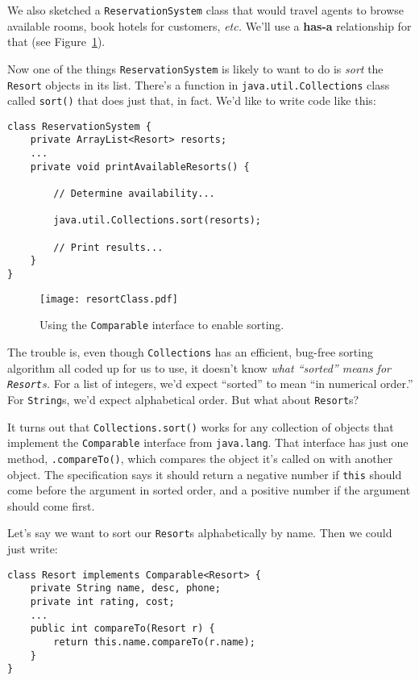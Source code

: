 We also sketched a \texttt{ReservationSystem} class that would travel agents
to browse available rooms, book hotels for customers, \textit{etc.} We'll use
a \textbf{has-a} relationship for that (see Figure~\ref{fig:resortClass}).

Now one of the things \texttt{ReservationSystem} is likely to want to do is
\textit{sort} the \texttt{Resort} objects in its list. There's a function in
\texttt{java.util.Collections} class called \texttt{sort()} that does just
that, in fact. We'd like to write code like this:

\begin{Verbatim}[fontsize=\small,samepage=true,frame=single]
class ReservationSystem {
    private ArrayList<Resort> resorts;
    ...
    private void printAvailableResorts() {

        // Determine availability...

        java.util.Collections.sort(resorts);

        // Print results...
    }
}
\end{Verbatim}

\begin{figure}[hb]
\centering
\texttt{[image: resortClass.pdf]}
\caption{Using the \texttt{Comparable} interface to enable sorting.}
\label{fig:resortClass}
\end{figure}

The trouble is, even though \texttt{Collections} has an efficient, bug-free
sorting algorithm all coded up for us to use, it doesn't know \textit{what
``sorted'' means for \texttt{Resort}s.} For a list of integers, we'd expect
``sorted'' to mean ``in numerical order.'' For \texttt{String}s, we'd expect
alphabetical order. But what about \texttt{Resort}s?

It turns out that \texttt{Collections.sort()} works for any collection of
objects that implement the \texttt{Comparable} interface from
\texttt{java.lang}. That interface has just one method, \texttt{.compareTo()},
which compares the object it's called on with another object. The
specification says it should return a negative number if \texttt{this} should
come before the argument in sorted order, and a positive number if the
argument should come first.

Let's say we want to sort our \texttt{Resort}s alphabetically by name. Then we
could just write:

\begin{Verbatim}[fontsize=\small,samepage=true,frame=single]
class Resort implements Comparable<Resort> {
    private String name, desc, phone;
    private int rating, cost;
    ...
    public int compareTo(Resort r) {
        return this.name.compareTo(r.name);
    }
}
\end{Verbatim}


